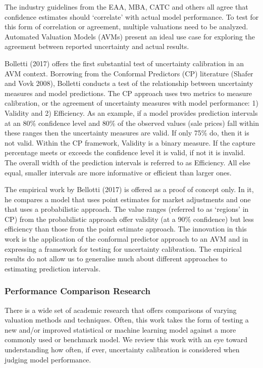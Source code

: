 \documentclass[colTwo]{anon}
\theoremstyle{definition}
\begin{document}
The industry guidelines from the EAA, MBA, CATC and others all agree that confidence estimates should ‘correlate’ with actual model performance.  To test for this form of correlation or agreement, multiple valuations need to be analyzed.  Automated Valuation Models (AVMs) present an ideal use case for exploring the agreement between reported uncertainty and actual results.

Bolletti (2017) offers the first substantial test of uncertainty calibration in an AVM context.  Borrowing from the Conformal Predictors (CP) literature (Shafer and Vovk 2008), Bolletti conducts a test of the relationship between uncertainty measures and model predictions. The CP approach uses two metrics to measure calibration, or the agreement of uncertainty measures with model performance: 1) Validity and 2) Efficiency.  As an example, if a model provides prediction intervals at an 80\% confidence level and 80\% of the observed values (sale prices) fall within these ranges then the uncertainty measures are valid. If only 75\% do, then it is not valid. Within the CP framework, Validity is a binary measure.  If the capture percentage meets or exceeds the confidence level it is valid, if not it is invalid. The overall width of the prediction intervals is referred to as Efficiency.  All else equal, smaller intervals are more informative or efficient than larger ones.

The empirical work by Bellotti (2017) is offered as a proof of concept only.  In it, he compares a model that uses point estimates for market adjustments and one that uses a probabilistic approach.  The value ranges (referred to as ‘regions’ in CP) from the probabilistic approach offer validity (at a 90\% confidence) but less efficiency than those from the point estimate approach.  The innovation in this work is the application of the conformal predictor approach to an AVM and in expressing a framework for testing for uncertainty calibration.  The empirical results do not allow us to generalise much about different approaches to estimating prediction intervals.

\subsubsection{Performance Comparison Research}

There is a wide set of academic research that offers comparisons of varying valuation methods and techniques. Often, this work takes the form of testing a new and/or improved statistical or machine learning model against a more commonly used or benchmark model.  We review this work with an eye toward understanding how often, if ever, uncertainty calibration is considered when judging model performance.
\end{document}
